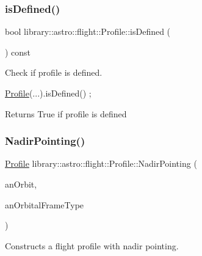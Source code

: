\subsubsection{\texorpdfstring{is\+Defined()}{isDefined()}}
{\footnotesize\ttfamily bool library\+::astro\+::flight\+::\+Profile\+::is\+Defined (\begin{DoxyParamCaption}{ }\end{DoxyParamCaption}) const}



Check if profile is defined. 


\begin{DoxyCode}
\hyperlink{classlibrary_1_1astro_1_1flight_1_1_profile_a34d66fdddf3eda9a3fed036d6b9a4363}{Profile}(...).isDefined() ;
\end{DoxyCode}


\begin{DoxyReturn}{Returns}
True if profile is defined 
\end{DoxyReturn}
\mbox{\label{classlibrary_1_1astro_1_1flight_1_1_profile_ac4096e4ced738e675f2f14722bbfbe14}} 
\subsubsection{\texorpdfstring{Nadir\+Pointing()}{NadirPointing()}}
{\footnotesize\ttfamily \hyperlink{classlibrary_1_1astro_1_1flight_1_1_profile}{Profile} library\+::astro\+::flight\+::\+Profile\+::\+Nadir\+Pointing (\begin{DoxyParamCaption}\item[{const \hyperlink{classlibrary_1_1astro_1_1trajectory_1_1_orbit}{trajectory\+::\+Orbit} \&}]{an\+Orbit,  }\item[{const \hyperlink{classlibrary_1_1astro_1_1trajectory_1_1_orbit_a816e83a0c220d4242ce2bebd32191cd8}{trajectory\+::\+Orbit\+::\+Frame\+Type} \&}]{an\+Orbital\+Frame\+Type }\end{DoxyParamCaption})\hspace{0.3cm}{\ttfamily [static]}}



Constructs a flight profile with nadir pointing. 


